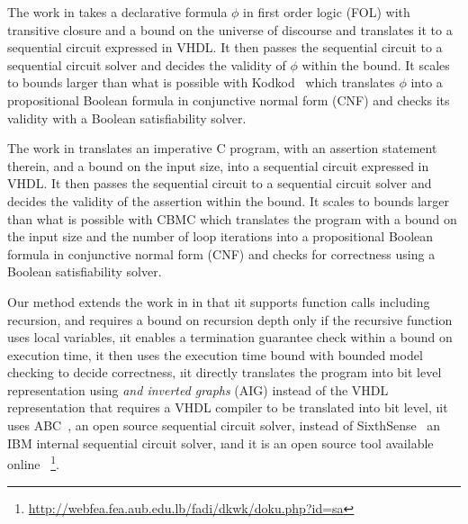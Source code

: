 
The work in\cite{seraICSE07} takes a declarative 
formula $\phi$ in first order logic
(FOL) with transitive closure and a bound on the 
universe of discourse and
translates it to a %
sequential circuit expressed in VHDL. 
It then passes the sequential circuit to a sequential 
circuit solver and decides
the validity of $\phi$ within the bound. 
It scales to bounds larger than what is possible with 
Kodkod~\cite{kodkodTJ2007}
which translates $\phi$ into a propositional Boolean 
formula in conjunctive
normal form (CNF) and checks its validity with a 
Boolean satisfiability solver. 

The work in\cite{sebacASE07} translates an imperative 
C program, with an assertion
statement therein, and a bound on the input size, 
into a %
sequential circuit expressed in VHDL. 
It then passes the sequential circuit to a 
sequential circuit solver and decides
the validity of the assertion within the bound. 
It scales to bounds larger than what is possible 
with CBMC\cite{cbmcDAC03} which
translates the program with a bound on the input 
size and the number of loop
iterations into a propositional Boolean formula 
in conjunctive normal form (CNF)
and checks for correctness using a Boolean 
satisfiability solver. 

Our method extends the work in \cite{seraICSE07,sebacASE07} in that
\be
\i it supports function calls including recursion, and requires a bound on
recursion depth only if the recursive function uses local variables, 
\i it enables a termination guarantee check within a bound on execution
time, it then uses the execution time bound with bounded model checking to
decide correctness,
\i it directly translates the program into bit level representation using {\em
and inverted graphs} (AIG) instead of the VHDL representation that requires a
VHDL compiler to be translated into bit level,
\i it uses ABC~\cite{brayton2010abc}, an open source sequential circuit solver, instead of
SixthSense~\cite{mony2004scalable} an IBM internal sequential circuit solver, 
\i and it is an open source tool available online
~\footnote{\label{fn:online}\url{
http://webfea.fea.aub.edu.lb/fadi/dkwk/doku.php?id=sa}}.
\ee
